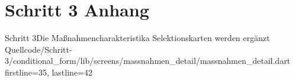 \chapter{Schritt 3 Anhang} 
\label{appendix:Schritt3Anhang}

\begin{alexlisting}{Schritt 3}{Die Maßnahmencharakteristika Selektionskarten werden ergänzt}
    {Quellcode/Schritt-3/conditional_form/lib/screens/massnahmen_detail/massnahmen_detail.dart}
    {firstline=35, lastline=42}
    \label{lst:Schritt3saveRecord}
\end{alexlisting}